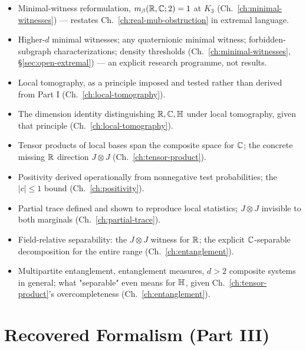 \begin{itemize}
\item[{[R]}] Minimal-witness reformulation, $m_\beta(\mathbb{R},\mathbb{C};2)=1$ at $K_3$
(Ch.~\ref{ch:minimal-witnesses}) — restates Ch.~\ref{ch:real-mub-obstruction}
in extremal language.
\item[{[U]}] Higher-$d$ minimal witnesses; any quaternionic minimal witness;
forbidden-subgraph characterizations; density thresholds
(Ch.~\ref{ch:minimal-witnesses}, \S\ref{sec:open-extremal}) — an explicit
research programme, not results.
\item[{[A]}] Local tomography, as a principle imposed and tested rather than
derived from Part I (Ch.~\ref{ch:local-tomography}).
\item[{[D]}] The dimension identity distinguishing $\mathbb{R},\mathbb{C},\mathbb{H}$ under local
tomography, given that principle (Ch.~\ref{ch:local-tomography}).
\item[{[D]}] Tensor products of local bases span the composite space for
$\mathbb{C}$; the concrete missing $\mathbb{R}$ direction $J\otimes J$
(Ch.~\ref{ch:tensor-product}).
\item[{[D]}] Positivity derived operationally from nonnegative test
probabilities; the $|c|\le1$ bound (Ch.~\ref{ch:positivity}).
\item[{[D]}] Partial trace defined and shown to reproduce local statistics;
$J\otimes J$ invisible to both marginals (Ch.~\ref{ch:partial-trace}).
\item[{[D]}] Field-relative separability: the $J\otimes J$ witness for $\mathbb{R}$;
the explicit $\mathbb{C}$-separable decomposition for the entire range
(Ch.~\ref{ch:entanglement}).
\item[{[U]}] Multipartite entanglement, entanglement measures, $d>2$
composite systems in general; what "separable" even means for $\mathbb{H}$, given
Ch.~\ref{ch:tensor-product}'s overcompleteness (Ch.~\ref{ch:entanglement}).
\end{itemize}

\section{Recovered Formalism (Part III)}

